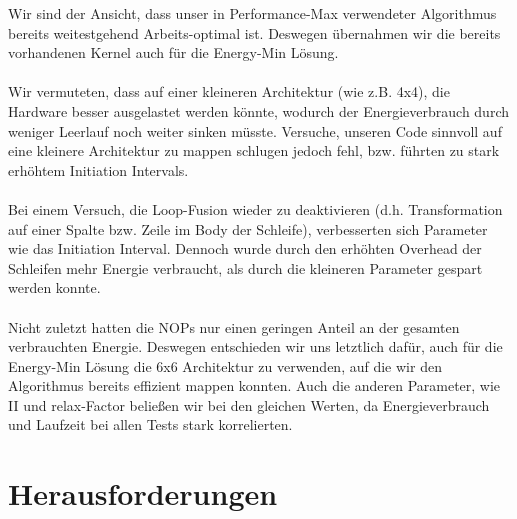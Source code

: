 \documentclass[oneside,11pt,accentcolor=tud2b, nochapname]{tudexercise}
\begin{document}
Wir sind der Ansicht, dass unser in Performance-Max verwendeter Algorithmus bereits weitestgehend Arbeits-optimal ist. Deswegen übernahmen wir die bereits vorhandenen Kernel auch für die Energy-Min Lösung.\\
\\
Wir vermuteten, dass auf einer kleineren Architektur (wie z.B. 4x4), die Hardware besser ausgelastet werden könnte, wodurch der Energieverbrauch durch weniger Leerlauf noch weiter sinken müsste.
Versuche, unseren Code sinnvoll auf eine kleinere Architektur zu mappen schlugen jedoch fehl, bzw. führten zu stark erhöhtem Initiation Intervals.\\
\\
Bei einem Versuch, die Loop-Fusion wieder zu deaktivieren (d.h. Transformation auf einer Spalte bzw. Zeile im Body der Schleife), verbesserten sich Parameter wie das Initiation Interval. Dennoch wurde durch den erhöhten Overhead der Schleifen mehr Energie verbraucht, als durch die kleineren Parameter gespart werden konnte.\\
\\
Nicht zuletzt hatten die NOPs nur einen geringen Anteil an der gesamten verbrauchten Energie. Deswegen entschieden wir uns letztlich dafür, auch für die Energy-Min Lösung die 6x6 Architektur zu verwenden, auf die wir den Algorithmus bereits effizient mappen konnten. Auch die anderen Parameter, wie II und relax-Factor beließen wir bei den gleichen Werten, da Energieverbrauch und Laufzeit bei allen Tests stark korrelierten.

\section*{Herausforderungen}
\end{document}
